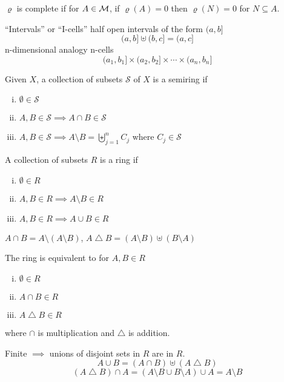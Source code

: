 \begin{definition}
  $\varrho$ is complete if for $A \in \mathcal M$, if $\varrho(A) = 0$ then $\varrho(N) = 0$ for $N \subseteq A$.
\end{definition}

``Intervals'' or ``I-cells'' half open intervals of the form $(a, b]$
\[(a, b] \uplus (b, c] = (a, c]\]
n-dimensional analogy n-cells
\[(a_1, b_1] \times (a_2, b_2] \times \dotsm \times (a_n, b_n]\]

\begin{definition}[Semiring]
  Given $X$, a collection of subsets $\mathcal{S}$ of $X$ is a semiring if 
  \begin{enumerate}[(i)]
    \item $\emptyset \in \mathcal{S}$
    \item $A, B \in \mathcal{S} \implies A \cap B \in \mathcal{S}$
    \item $A, B \in \mathcal{S} \implies A \setminus B = \biguplus_{j=1}^n C_j$ where $C_j \in \mathcal{S}$
  \end{enumerate}
\end{definition}

\begin{definition}[Ring]
  A collection of subsets $R$ is a ring if 
  \begin{enumerate}[(i)]
    \item $\emptyset \in R$
    \item $A, B \in R \implies A \setminus B \in R$
    \item $A, B \in R \implies A \cup B \in R$
  \end{enumerate}
\end{definition}

\begin{remark}
  $A \cap B = A \setminus (A \setminus B)$, $A \bigtriangleup B = (A \setminus B) \uplus (B \setminus A)$
  
  The ring is equivalent to for $A, B \in R$
  \begin{enumerate}[(i)]
    \item $\emptyset \in R$
    \item $A \cap B \in R$
    \item $A \bigtriangleup B \in R$
  \end{enumerate}
  where $\cap$ is multiplication and $\bigtriangleup$ is addition.

  Finite $\implies$ unions of disjoint sets in $R$ are in $R$.
  \[A \cup B = (A \cap B) \uplus (A \bigtriangleup B)\]
  \[(A \bigtriangleup B)\cap A = (A \setminus B \cup B \setminus A) \cup A = A \setminus B\]
\end{remark}
  

